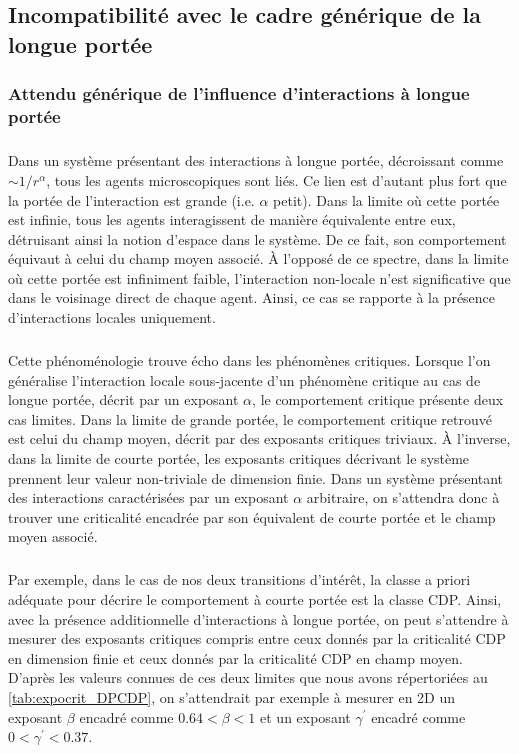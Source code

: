 \subsection{Incompatibilité avec le cadre générique de la longue portée}

\subsubsection{Attendu générique de l'influence d'interactions à longue portée}

\subparagraph{}Dans un système présentant des interactions à longue portée, décroissant comme ${\sim 1/r^\alpha}$, tous les agents microscopiques sont liés. Ce lien est d'autant plus fort que la portée de l'interaction est grande (i.e. $\alpha$ petit). Dans la limite où cette portée est infinie, tous les agents interagissent de manière équivalente entre eux, détruisant ainsi la notion d'espace dans le système. De ce fait, son comportement équivaut à celui du champ moyen associé. \`A l'opposé de ce spectre, dans la limite où cette portée est infiniment faible, l'interaction non-locale n'est significative que dans le voisinage direct de chaque agent. Ainsi, ce cas se rapporte à la présence d'interactions locales uniquement.

\subparagraph{}Cette phénoménologie trouve écho dans les phénomènes critiques. Lorsque l'on généralise l'interaction locale sous-jacente d'un phénomène critique au cas de longue portée, décrit par un exposant $\alpha$, le comportement critique présente deux cas limites. Dans la limite de grande portée, le comportement critique retrouvé est celui du champ moyen, décrit par des exposants critiques triviaux. \`A l'inverse, dans la limite de courte portée, les exposants critiques décrivant le système prennent leur valeur non-triviale de dimension finie. Dans un système présentant des interactions caractérisées par un exposant $\alpha$ arbitraire, on s'attendra donc à trouver une criticalité encadrée par son équivalent de courte portée et le champ moyen associé.

\subparagraph{}Par exemple, dans le cas de nos deux transitions d'intérêt, la classe a priori adéquate pour décrire le comportement à courte portée est la classe CDP. Ainsi, avec la présence additionnelle d'interactions à longue portée, on peut s'attendre à mesurer des exposants critiques compris entre ceux donnés par la criticalité CDP en dimension finie et ceux donnés par la criticalité CDP en champ moyen. D'après les valeurs connues de ces deux limites que nous avons répertoriées au \autoref{tab:expocrit_DPCDP}, on s'attendrait par exemple à mesurer en 2D un exposant $\beta$ encadré comme $0.64 < \beta < 1$ et un exposant $\gamma^\prime$ encadré comme $0 < \gamma^\prime < 0.37$.

